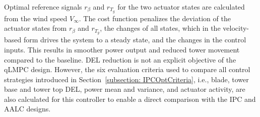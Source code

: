 Optimal reference signals $r_\beta$ and $r_{T_g}$ for the two actuator states are calculated from the wind speed $V_\infty$. The cost function penalizes the deviation of the actuator states from $r_\beta$ and $r_{T_g}$, the changes of all states, which in the velocity-based form drives the system to a steady state, and the changes in the control inputs. This results in smoother power output and reduced tower movement compared to the baseline. DEL reduction is not an explicit objective of the qLMPC design. However, the six evaluation criteria used to compare all control strategies introduced in Section~\ref{subsection: IPCOptCriteria}, i.e., blade, tower base and tower top DEL, power mean and variance, and actuator activity, are also calculated for this controller to enable a direct comparison with the IPC and AALC designs.

